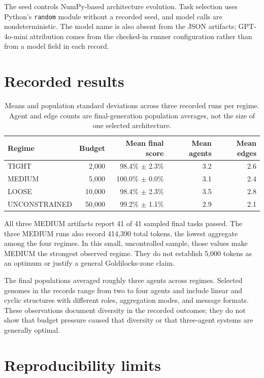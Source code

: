 \documentclass[11pt]{article}
\begin{document}
The seed controls NumPy-based architecture evolution. Task selection uses
Python's \texttt{random} module without a recorded seed, and model calls are
nondeterministic. The model name is also absent from the JSON artifacts;
GPT-4o-mini attribution comes from the checked-in runner configuration rather
than from a model field in each record.

\section{Recorded results}

\begin{table}[h]
\centering
\begin{tabular}{lrrrr}
\toprule
Regime & Budget & Mean final score & Mean agents & Mean edges \\
\midrule
TIGHT & 2,000 & 98.4\% $\pm$ 2.3\% & 3.2 & 2.6 \\
MEDIUM & 5,000 & 100.0\% $\pm$ 0.0\% & 3.1 & 2.4 \\
LOOSE & 10,000 & 98.4\% $\pm$ 2.3\% & 3.5 & 2.8 \\
UNCONSTRAINED & 50,000 & 99.2\% $\pm$ 1.1\% & 2.9 & 2.1 \\
\bottomrule
\end{tabular}
\caption{Means and population standard deviations across three recorded runs
per regime. Agent and edge counts are final-generation population averages,
not the size of one selected architecture.}
\end{table}

All three MEDIUM artifacts report 41 of 41 sampled final tasks passed. The
three MEDIUM runs also record 414,390 total tokens, the lowest aggregate among
the four regimes. In this small, uncontrolled sample, those values make MEDIUM
the strongest observed regime. They do not establish 5,000 tokens as an
optimum or justify a general Goldilocks-zone claim.

The final populations averaged roughly three agents across regimes. Selected
genomes in the records range from two to four agents and include linear and
cyclic structures with different roles, aggregation modes, and message
formats. These observations document diversity in the recorded outcomes; they
do not show that budget pressure caused that diversity or that three-agent
systems are generally optimal.

\section{Reproducibility limits}
\end{document}
